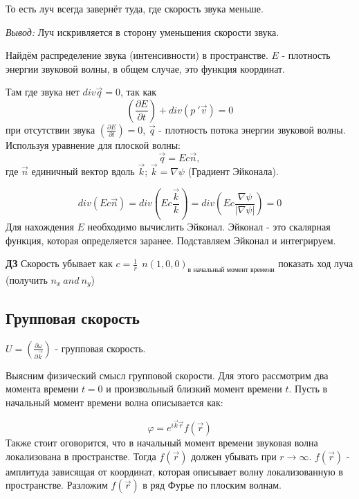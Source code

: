 \documentclass[14pt,a4paper,oneside]{extarticle}	%
\newcommand{\bracket}[1] {\left( #1 \right) } %
\newcommand{\dif}[2] {\bracket{ \frac{\partial #1}{\partial #2} }}
\begin{document}
То есть луч всегда завернёт туда, где скорость звука меньше. 

\textit{Вывод:} Луч искривляется в сторону уменьшения скорости звука.

Найдём распределение звука (интенсивности) в пространстве.
$ E $ - плотность энергии звуковой волны, в общем случае, это функция координат.

Там где звука нет $ div\vec{q} = 0 $, так как 
\begin{equation*}
\dif{E}{t} + div(p\:'\vec{v}) = 0 
\end{equation*}
при отсутствии звука $ \dif{E}{t} = 0 $, $ \vec{q} $ - плотность потока энергии звуковой волны.
Используя уравнение для плоской волны:
\begin{equation*}
\vec{q} = E c \vec{n},
\end{equation*}
где $ \vec{n} $ единичный вектор вдоль $ \vec{k} $; $ \vec{k} = \nabla \psi  $ (Градиент Эйконала).

\begin{equation*}
div(E c \vec{n} ) = div(E c \frac{\vec{k}}{k} ) = div(E c \frac{\nabla\psi}{|\nabla\psi|})=0
\end{equation*}
Для нахождения $ E $ необходимо вычислить Эйконал.
Эйконал - это скалярная функция, которая определяется заранее.
Подставляем Эйконал и интегрируем.
 

\begin{center}
	\textbf{ДЗ} Скорость убывает как $ c = \frac{1}{r} \:\: n(1,0,0)_{\text{в начальный момент времени}}$ показать ход луча (получить $ n_{x}\: and\: n_{y}  $) 
\end{center}

\begin{center}
	\subsection*{Групповая скорость } %
\end{center}
$ U = \dif{\omega}{\vec{k}} $ - групповая скорость.

Выясним физический смысл групповой скорости.
Для этого рассмотрим два момента времени $ t =0  $ и произвольный близкий момент времени $ t $.
Пусть в начальный момент времени волна описывается как:

\begin{equation*}
\varphi = e^{i\vec{k}\vec{r}}f(\vec{r})
\end{equation*}
Также стоит оговорится, что в начальный момент времени звуковая волна локализована в пространстве. Тогда $ f(\vec{r}) $
должен убывать при $ r \longrightarrow \infty $. $ f(\vec{r}) $ - амплитуда зависящая от координат, которая описывает волну локализованную в пространстве.
Разложим $ f(\vec{r}) $ в ряд Фурье по плоским волнам.
\end{document}
